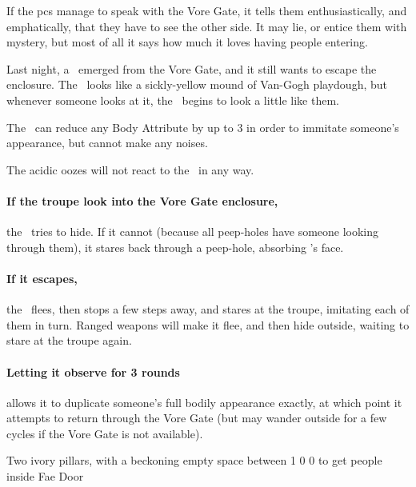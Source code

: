 \begin{multicols}{2}
If the \glspl{pc} manage to speak with the Vore Gate, it tells them enthusiastically, and emphatically, that they have to see the other side.
It may lie, or entice them with mystery, but most of all it says how much it loves having people entering.

\setcounter{statDots}{0}
Last night, a \superWierdzi\ emerged from the Vore Gate, and it still wants to escape the enclosure.
The \superWierdzi\ looks like a sickly-yellow mound of Van-Gogh playdough, but whenever someone looks at it, the \superWierdzi\ begins to look a little like them.

\mphlg

The \superWierdzi\ can reduce any Body Attribute by up to 3 in order to immitate someone's appearance, but cannot make any noises.

The acidic oozes will not react to the \superWierdzi\ in any way.

\paragraph{If the troupe look into the Vore Gate enclosure,}
the \superWierdzi\ tries to hide.
If it cannot (because all peep-holes have someone looking through them), it stares back through a peep-hole, absorbing 's face.

\paragraph{If it escapes,}
the \superWierdzi\ flees, then stops a few steps away, and stares at the troupe, imitating each of them in turn.
Ranged weapons will make it flee, and then hide outside, waiting to stare at the troupe again.

\paragraph{Letting it observe for 3 rounds}
allows it to duplicate someone's full bodily appearance exactly, at which point it attempts to return through the Vore Gate (but may wander outside for a few \glspl{cycle} if the Vore Gate is not available).

  {Two ivory pillars, with a beckoning empty space between}%
  {1}%
  {0}%
  {0}%
  {to get people inside}%
  {Fae Door}%
  {
    \setcounter{Fire}{3}
    \setcounter{Earth}{2}
    \setcounter{Fate}{1}
    \setcounter{Water}{1}
    \setcounter{Academics}{2}
    \setcounter{Wyldcrafting}{1}
  }%


\end{multicols}
